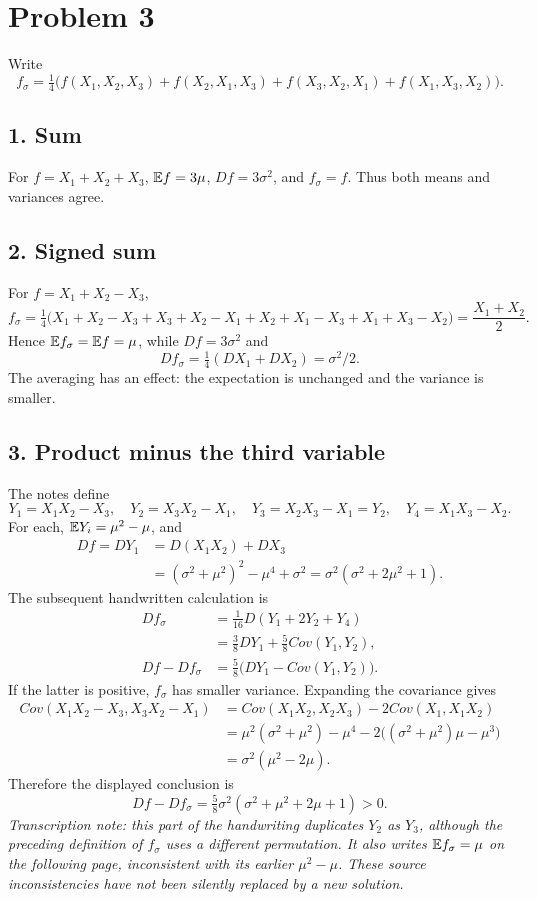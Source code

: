 \documentclass[a4paper]{article}
\begin{document}
\section*{Problem 3}
Write
\[f_\sigma=\tfrac14\bigl(f(X_1,X_2,X_3)+f(X_2,X_1,X_3)+f(X_3,X_2,X_1)+f(X_1,X_3,X_2)\bigr).\]
\subsection*{1. Sum}
For $f=X_1+X_2+X_3$, $\mathbb {E} f=3\mu$, $Df=3\sigma^2$, and $f_\sigma=f$. Thus both means and variances agree.
\subsection*{2. Signed sum}
For $f=X_1+X_2-X_3$,
\[f_\sigma=\tfrac14\bigl(X_1+X_2-X_3+X_3+X_2-X_1+X_2+X_1-X_3+X_1+X_3-X_2\bigr)=\frac{X_1+X_2}{2}.\]
Hence $\mathbb {E} f_\sigma=\mathbb {E} f=\mu$, while $Df=3\sigma^2$ and
\[Df_\sigma=\tfrac14(DX_1+DX_2)=\sigma^2/2.\]
The averaging has an effect: the expectation is unchanged and the variance is smaller.
\subsection*{3. Product minus the third variable}
The notes define
\[Y_1=X_1X_2-X_3,\quad Y_2=X_3X_2-X_1,\quad Y_3=X_2X_3-X_1=Y_2,\quad Y_4=X_1X_3-X_2.\]
For each, $\mathbb {E} Y_i=\mu^2-\mu$, and
\begin{align*}
Df=DY_1&=D(X_1X_2)+DX_3\\
&=(\sigma^2+\mu^2)^2-\mu^4+\sigma^2
=\sigma^2(\sigma^2+2\mu^2+1).
\end{align*}
The subsequent handwritten calculation is
\begin{align*}
Df_\sigma&=\tfrac1{16}D(Y_1+2Y_2+Y_4)\\
&=\tfrac38DY_1+\tfrac58Cov(Y_1,Y_2),\\
Df-Df_\sigma&=\tfrac58\bigl(DY_1-Cov(Y_1,Y_2)\bigr).
\end{align*}
If the latter is positive, $f_\sigma$ has smaller variance. Expanding the covariance gives
\begin{align*}
Cov(X_1X_2-X_3,X_3X_2-X_1)
&=Cov(X_1X_2,X_2X_3)-2Cov(X_1,X_1X_2)\\
&=\mu^2(\sigma^2+\mu^2)-\mu^4-2\bigl((\sigma^2+\mu^2)\mu-\mu^3\bigr)\\
&=\sigma^2(\mu^2-2\mu).
\end{align*}
Therefore the displayed conclusion is
\[Df-Df_\sigma=\tfrac58\sigma^2(\sigma^2+\mu^2+2\mu+1)>0.\]
\noindent\textit{Transcription note: this part of the handwriting duplicates $Y_2$ as $Y_3$, although the preceding definition of $f_\sigma$ uses a different permutation. It also writes $\mathbb {E} f_\sigma=\mu$ on the following page, inconsistent with its earlier $\mu^2-\mu$. These source inconsistencies have not been silently replaced by a new solution.}
\end{document}
